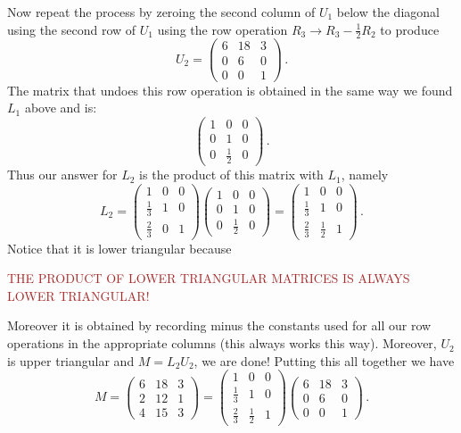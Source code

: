 Now repeat the process by zeroing the second column of $U_1$ below the diagonal using the second row of $U_1$ using the row operation
$R_3\to R_3-\frac 12 R_2$ to produce
\[U_2=\begin{pmatrix}6&18&3\\0&6&0\\0&0&1\end{pmatrix}\, .\]
The matrix that undoes this row operation is obtained in the same way we found $L_1$ above and is:
\[
\begin{pmatrix}
1&0&0\\
0&1&0\\
0&\frac 12& 0
\end{pmatrix}\, .
\]
Thus our answer for $L_2$ is the product of this matrix with $L_1$, namely
\[
L_2=
\begin{pmatrix}
1 & 0 & 0 \\[1mm]
\frac{1}{3} & 1 & 0 \\[1mm]
\frac{2}{3} & 0 & 1 
\end{pmatrix}\begin{pmatrix}
1&0&0\\
0&1&0\\
0&\frac 12& 0
\end{pmatrix}
=\begin{pmatrix}
1 & 0 & 0 \\[1mm]
\frac{1}{3} & 1 & 0 \\[1mm]
\frac{2}{3} & \frac{1}{2} & 1 
\end{pmatrix}\, .
\]
Notice that it is lower triangular because 

\begin{center}
\textcolor{brown}{THE PRODUCT OF LOWER TRIANGULAR MATRICES IS ALWAYS LOWER TRIANGULAR!}
\end{center}

\noindent
Moreover it is obtained by recording minus the constants used for all our row operations in the appropriate columns (this always works this way).
Moreover, $U_2$ is upper triangular and $M=L_2U_2$, we are done!
Putting this all together we have
\[M=\begin{pmatrix}
6 & 18 & 3 \\
2 & 12 & 1 \\
4 & 15 & 3 
\end{pmatrix}= \begin{pmatrix}
1 & 0 & 0 \\[1mm]
\frac{1}{3} & 1 & 0 \\[1mm]
\frac{2}{3} & \frac{1}{2} & 1 
\end{pmatrix}\begin{pmatrix}
6 & 18 & 3 \\
0 & 6 & 0 \\
0 & 0 & 1 
\end{pmatrix}\, .\]  

